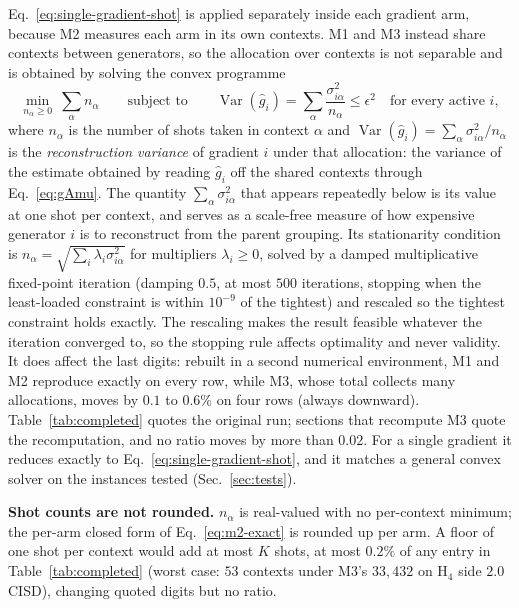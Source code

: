 \documentclass[10pt]{article}
\newcommand{\Var}{\operatorname{Var}}
\begin{document}
Eq.~\eqref{eq:single-gradient-shot} is applied separately inside each gradient arm, because M2 measures each arm in its own contexts. M1 and M3 instead share contexts between generators, so the allocation over contexts is not separable and is obtained by solving the convex programme
\begin{equation}
  \min_{n_\alpha \ge 0} \ \sum_{\alpha} n_\alpha
  \qquad\text{subject to}\qquad
  \Var(\widehat g_i)=\sum_{\alpha}\frac{\sigma_{i\alpha}^{2}}{n_\alpha}\le\epsilon^{2}
  \quad\text{for every active } i ,
  \label{eq:allocation}
\end{equation}
where $n_\alpha$ is the number of shots taken in context $\alpha$ and $\Var(\widehat g_i)=\sum_\alpha\sigma_{i\alpha}^2/n_\alpha$ is the \emph{reconstruction variance} of gradient $i$ under that allocation: the variance of the estimate obtained by reading $\widehat g_i$ off the shared contexts through Eq.~\eqref{eq:gAmu}. The quantity $\sum_\alpha\sigma_{i\alpha}^2$ that appears repeatedly below is its value at one shot per context, and serves as a scale-free measure of how expensive generator $i$ is to reconstruct from the parent grouping. Its stationarity condition is $n_\alpha=\sqrt{\sum_i\lambda_i\sigma_{i\alpha}^{2}}$ for multipliers $\lambda_i\ge0$, solved by a damped multiplicative fixed-point iteration (damping $0.5$, at most $500$ iterations, stopping when the least-loaded constraint is within $10^{-9}$ of the tightest) and rescaled so the tightest constraint holds exactly. The rescaling makes the result feasible whatever the iteration converged to, so the stopping rule affects optimality and never validity. It does affect the last digits: rebuilt in a second numerical environment, M1 and M2 reproduce exactly on every row, while M3, whose total collects many allocations, moves by $0.1$ to $0.6\%$ on four rows (always downward). Table~\ref{tab:completed} quotes the original run; sections that recompute M3 quote the recomputation, and no ratio moves by more than $0.02$. For a single gradient it reduces exactly to Eq.~\eqref{eq:single-gradient-shot}, and it matches a general convex solver on the instances tested (Sec.~\ref{sec:tests}).

\textbf{Shot counts are not rounded.} $n_\alpha$ is real-valued with no per-context minimum; the per-arm closed form of Eq.~\eqref{eq:m2-exact} is rounded up per arm. A floor of one shot per context would add at most $K$ shots, at most $0.2\%$ of any entry in Table~\ref{tab:completed} (worst case: $53$ contexts under M3's $33{,}432$ on H$_4$ side $2.0$ CISD), changing quoted digits but no ratio.
\end{document}
